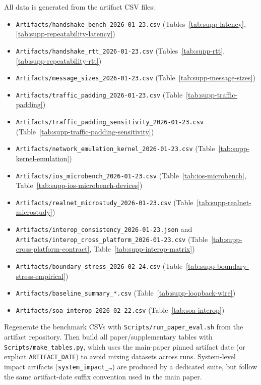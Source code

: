 \documentclass[10pt,journal,compsoc]{IEEEtran}
\begin{document}
All data is generated from the artifact CSV files:
\begin{itemize}
\raggedright
\item \texttt{Artifacts/\allowbreak handshake\_\allowbreak bench\_2026-01-23.csv} (Tables~\ref{tab:supp-latency}, \ref{tab:supp-repeatability-latency})
\item \texttt{Artifacts/\allowbreak handshake\_\allowbreak rtt\_2026-01-23.csv} (Tables~\ref{tab:supp-rtt}, \ref{tab:supp-repeatability-rtt})
\item \texttt{Artifacts/\allowbreak message\_\allowbreak sizes\_2026-01-23.csv} (Table~\ref{tab:supp-message-sizes})
\item \texttt{Artifacts/\allowbreak traffic\_\allowbreak padding\_2026-01-23.csv} (Table~\ref{tab:supp-traffic-padding})
\item \texttt{Artifacts/\allowbreak traffic\_\allowbreak padding\_\allowbreak sensitivity\_2026-01-23.csv} (Table~\ref{tab:supp-traffic-padding-sensitivity})
\item \texttt{Artifacts/\allowbreak network\_\allowbreak emulation\_\allowbreak kernel\_2026-01-23.csv} (Table~\ref{tab:supp-kernel-emulation})
\item \texttt{Artifacts/\allowbreak ios\_\allowbreak microbench\_2026-01-23.csv} (Table~\ref{tab:ios-microbench}, Table~\ref{tab:supp-ios-microbench-devices})
\item \texttt{Artifacts/\allowbreak realnet\_\allowbreak microstudy\_2026-01-23.csv} (Table~\ref{tab:supp-realnet-microstudy})
\item \texttt{Artifacts/\allowbreak interop\_\allowbreak consistency\_2026-01-23.json} and \texttt{Artifacts/\allowbreak interop\_\allowbreak cross\_\allowbreak platform\_2026-01-23.csv} (Table~\ref{tab:supp-cross-platform-contract}, Table~\ref{tab:supp-interop-matrix})
\item \texttt{Artifacts/\allowbreak boundary\_\allowbreak stress\_2026-02-24.csv} (Table~\ref{tab:supp-boundary-stress-empirical})
\item \texttt{Artifacts/\allowbreak baseline\_\allowbreak summary\_*.csv} (Table~\ref{tab:supp-loopback-wire})
\item \texttt{Artifacts/\allowbreak soa\_\allowbreak interop\_2026-02-22.csv} (Table~\ref{tab:soa-interop})
\end{itemize}

Regenerate the benchmark CSVs with
\texttt{Scripts/\allowbreak run\_\allowbreak paper\_\allowbreak eval.sh}
from the artifact repository. Then build all paper/supplementary tables with
\texttt{Scripts/\allowbreak make\_\allowbreak tables.py}, which uses the
main-paper pinned artifact date (or explicit \texttt{ARTIFACT\_DATE}) to avoid
mixing datasets across runs. System-level impact artifacts
(\texttt{system\_impact\_\ldots}) are produced by a dedicated suite, but follow
the same artifact-date suffix convention used in the main paper.
\end{document}
